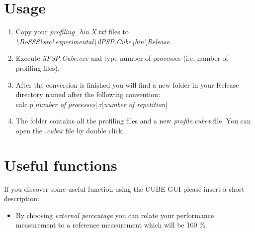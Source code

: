 \documentclass[11pt,twoside,a4paper]{fdyartcl}
\theoremstyle{myPlain}
\theoremstyle{myDefinition}
\begin{document}
\section{Usage}
\begin{enumerate}
	\item Copy your \textit{profiling\_bin.X.txt} files to \textit{\textbackslash BoSSS\textbackslash src\textbackslash experimental\textbackslash ilPSP.Cube\textbackslash bin\textbackslash Release}.
	\item Execute \textit{ilPSP.Cube.exe} and type number of processes (i.e. number of profiling files).
	\item After the conversion is finished you will find a new folder in your Release directory named after the following convention: \\  calc.p[\textit{number of processes}].r[\textit{number of repetition}]
	\item The folder contains all the profiling files and a new \textit{profile.cubex} file. You can open the \textit{.cubex} file by double click.
\end{enumerate}




\section{Useful functions}
If you discover some useful function using the CUBE GUI please insert a short description:

\begin{itemize}
	\item By choosing \textit{external percentage} you can relate your performance measurement to a reference measurement which will be 100 \%. 
\end{itemize}
\end{document}

